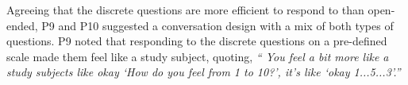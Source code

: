         
        Agreeing that the discrete questions are more efficient to respond to than open-ended, P9 and P10 suggested a conversation design with a mix of both types of questions. P9 noted that responding to the discrete questions on a pre-defined scale made them feel like a study subject, quoting,
        \textit{``
        You feel a bit more like a study subjects like okay `How do you feel from 1 to 10?', it's like `okay 1...5...3'.''} 

        
